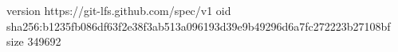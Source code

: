 version https://git-lfs.github.com/spec/v1
oid sha256:b1235fb086df63f2e38f3ab513a096193d39e9b49296d6a7fc272223b27108bf
size 349692
